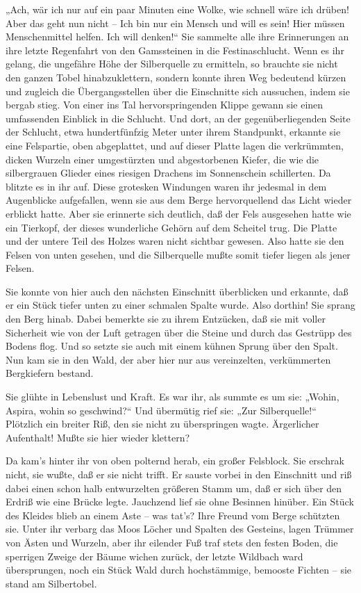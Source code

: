 „Ach, wär ich nur auf ein paar Minuten eine Wolke, wie schnell wäre
ich drüben! Aber das geht nun nicht – Ich bin nur ein Mensch und
will es sein! Hier müssen Menschenmittel helfen. Ich will denken!“
Sie sammelte alle ihre Erinnerungen an ihre letzte Regenfahrt von
den Gamssteinen in die Festinaschlucht. Wenn es ihr gelang, die
ungefähre Höhe der Silberquelle zu ermitteln, so brauchte sie nicht
den ganzen Tobel hinabzuklettern, sondern konnte ihren Weg
bedeutend kürzen und zugleich die Übergangsstellen über die
Einschnitte sich aussuchen, indem sie bergab stieg. Von einer ins
Tal hervorspringenden Klippe gewann sie einen umfassenden Einblick
in die Schlucht. Und dort, an der gegenüberliegenden Seite der
Schlucht, etwa hundertfünfzig Meter unter ihrem Standpunkt,
erkannte sie eine Felspartie, oben abgeplattet, und auf dieser
Platte lagen die verkrümmten, dicken Wurzeln einer umgestürzten und
abgestorbenen Kiefer, die wie die silbergrauen Glieder eines
riesigen Drachens im Sonnenschein schillerten. Da blitzte es in ihr
auf. Diese grotesken Windungen waren ihr jedesmal in dem
Augenblicke aufgefallen, wenn sie aus dem Berge hervorquellend das
Licht wieder erblickt hatte. Aber sie erinnerte sich deutlich, daß
der Fels ausgesehen hatte wie ein Tierkopf, der dieses wunderliche
Gehörn auf dem Scheitel trug. Die Platte und der untere Teil des
Holzes waren nicht sichtbar gewesen. Also hatte sie den Felsen von
unten gesehen, und die Silberquelle mußte somit tiefer liegen als
jener Felsen.

Sie konnte von hier auch den nächsten Einschnitt überblicken und
erkannte, daß er ein Stück tiefer unten zu einer schmalen Spalte
wurde. Also dorthin! Sie sprang den Berg hinab. Dabei bemerkte sie
zu ihrem Entzücken, daß sie mit voller Sicherheit wie von der Luft
getragen über die Steine und durch das Gestrüpp des Bodens flog.
Und so setzte sie auch mit einem kühnen Sprung über den Spalt. Nun
kam sie in den Wald, der aber hier nur aus vereinzelten,
verkümmerten Bergkiefern bestand.

Sie glühte in Lebenslust und Kraft. Es war ihr, als summte es um
sie: „Wohin, Aspira, wohin so geschwind?“ Und übermütig rief sie:
„Zur Silberquelle!“ Plötzlich ein breiter Riß, den sie nicht zu
überspringen wagte. Ärgerlicher Aufenthalt! Mußte sie hier wieder
klettern?

Da kam's hinter ihr von oben polternd herab, ein großer Felsblock.
Sie erschrak nicht, sie wußte, daß er sie nicht trifft. Er sauste
vorbei in den Einschnitt und riß dabei einen schon halb
entwurzelten größeren Stamm um, daß er sich über den Erdriß wie
eine Brücke legte. Jauchzend lief sie ohne Besinnen hinüber. Ein
Stück des Kleides blieb an einem Aste – was tat's? Ihre Freund vom
Berge schützten sie. Unter ihr verbarg das Moos Löcher und Spalten
des Gesteins, lagen Trümmer von Ästen und Wurzeln, aber ihr
eilender Fuß traf stets den festen Boden, die sperrigen Zweige der
Bäume wichen zurück, der letzte Wildbach ward übersprungen, noch
ein Stück Wald durch hochstämmige, bemooste Fichten – sie stand am
Silbertobel.


